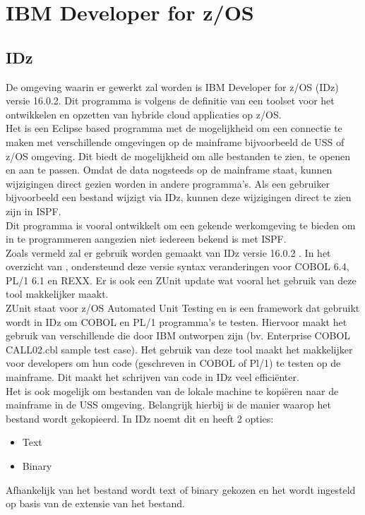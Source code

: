 \section{IBM Developer for z/OS}
\label{sec:IBM Developer for z/OS (IDz)}
\subsection{IDz}
De omgeving waarin er gewerkt zal worden is IBM Developer for z/OS (IDz) versie 16.0.2. Dit programma is volgens de definitie van \textcite{Spohn2023} een toolset voor het ontwikkelen en opzetten van hybride cloud applicaties op z/OS. \\
Het is een Eclipse based programma met de mogelijkheid om een connectie te maken met verschillende omgevingen op de mainframe bijvoorbeeld de USS of z/OS omgeving. Dit biedt de mogelijkheid om alle bestanden te zien, te openen en aan te passen. Omdat de data nogsteeds op de mainframe staat, kunnen wijzigingen direct gezien worden in andere programma's. Als een gebruiker bijvoorbeeld een bestand wijzigt via IDz, kunnen deze wijzigingen direct te zien zijn in ISPF. \\
Dit programma is vooral ontwikkelt om een gekende werkomgeving te bieden om in te programmeren aangezien niet iedereen bekend is met ISPF. \\

Zoals vermeld zal er gebruik worden gemaakt van IDz versie 16.0.2 . In het overzicht van \textcite{IBM2024}, ondersteund deze versie syntax veranderingen voor COBOL 6.4, PL/1 6.1 en REXX. Er is ook een ZUnit update wat vooral het gebruik van deze tool makkelijker maakt. \\

ZUnit staat voor z/OS Automated Unit Testing en is een framework dat gebruikt wordt in IDz om COBOL en PL/1 programma's te testen. Hiervoor maakt het gebruik van verschillende  die door IBM ontworpen zijn (bv. Enterprise COBOL CALL02.cbl sample test case). Het gebruik van deze tool maakt het makkelijker voor developers om hun code (geschreven in COBOL of Pl/1) te testen op de mainframe. Dit maakt het schrijven van code in IDz veel efficiënter. \autocite{IBM2024a} \\

Het is ook mogelijk om bestanden van de lokale machine te kopiëren naar de mainframe in de USS omgeving. Belangrijk hierbij is de manier waarop het bestand wordt gekopieerd. In IDz noemt dit  en heeft 2 opties: 
\begin{itemize}
    \item Text
    \item Binary
\end{itemize}
Afhankelijk van het bestand wordt text of binary gekozen en het wordt ingesteld op basis van de extensie van het bestand.

